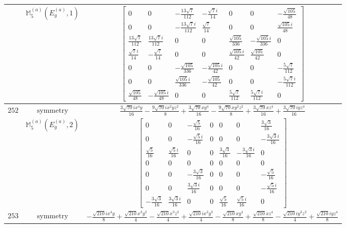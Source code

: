 \documentclass[fleqn,8pt,landscape]{jsarticle}
\begin{document}
\begin{longtable}{ccc}
$  $ & $ \mathbb{M}_{5}^{(a)}(E_{g}^{(a)},1) $ & $ \begin{bmatrix} 0 & 0 & - \frac{13 \sqrt{7}}{112} & - \frac{\sqrt{7} i}{14} & 0 & 0 & - \frac{\sqrt{105}}{48} \\ 0 & 0 & - \frac{13 \sqrt{7} i}{112} & \frac{\sqrt{7}}{14} & 0 & 0 & \frac{\sqrt{105} i}{48} \\ \frac{13 \sqrt{7}}{112} & \frac{13 \sqrt{7} i}{112} & 0 & 0 & \frac{\sqrt{105}}{336} & - \frac{\sqrt{105} i}{336} & 0 \\ \frac{\sqrt{7} i}{14} & - \frac{\sqrt{7}}{14} & 0 & 0 & \frac{\sqrt{105} i}{42} & \frac{\sqrt{105}}{42} & 0 \\ 0 & 0 & - \frac{\sqrt{105}}{336} & - \frac{\sqrt{105} i}{42} & 0 & 0 & - \frac{5 \sqrt{7}}{112} \\ 0 & 0 & \frac{\sqrt{105} i}{336} & - \frac{\sqrt{105}}{42} & 0 & 0 & - \frac{5 \sqrt{7} i}{112} \\ \frac{\sqrt{105}}{48} & - \frac{\sqrt{105} i}{48} & 0 & 0 & \frac{5 \sqrt{7}}{112} & \frac{5 \sqrt{7} i}{112} & 0 \end{bmatrix} $ \\ \hline
$ 252 $ & $ \text{symmetry} $ & $ \frac{3 \sqrt{70} i x^{4} y}{16} - \frac{9 \sqrt{70} i x^{2} y z^{2}}{8} + \frac{3 \sqrt{70} x y^{4}}{16} - \frac{9 \sqrt{70} x y^{2} z^{2}}{8} + \frac{3 \sqrt{70} x z^{4}}{16} + \frac{3 \sqrt{70} i y z^{4}}{16} $ \\
$  $ & $ \mathbb{M}_{5}^{(a)}(E_{g}^{(a)},2) $ & $ \begin{bmatrix} 0 & 0 & - \frac{\sqrt{5}}{16} & 0 & 0 & 0 & \frac{3 \sqrt{3}}{16} \\ 0 & 0 & - \frac{\sqrt{5} i}{16} & 0 & 0 & 0 & - \frac{3 \sqrt{3} i}{16} \\ \frac{\sqrt{5}}{16} & \frac{\sqrt{5} i}{16} & 0 & 0 & \frac{3 \sqrt{3}}{16} & - \frac{3 \sqrt{3} i}{16} & 0 \\ 0 & 0 & 0 & 0 & 0 & 0 & 0 \\ 0 & 0 & - \frac{3 \sqrt{3}}{16} & 0 & 0 & 0 & - \frac{\sqrt{5}}{16} \\ 0 & 0 & \frac{3 \sqrt{3} i}{16} & 0 & 0 & 0 & - \frac{\sqrt{5} i}{16} \\ - \frac{3 \sqrt{3}}{16} & \frac{3 \sqrt{3} i}{16} & 0 & 0 & \frac{\sqrt{5}}{16} & \frac{\sqrt{5} i}{16} & 0 \end{bmatrix} $ \\ \hline
$ 253 $ & $ \text{symmetry} $ & $ - \frac{\sqrt{210} i x^{4} y}{8} + \frac{\sqrt{210} x^{3} y^{2}}{4} - \frac{\sqrt{210} x^{3} z^{2}}{4} + \frac{\sqrt{210} i x^{2} y^{3}}{4} - \frac{\sqrt{210} x y^{4}}{8} + \frac{\sqrt{210} x z^{4}}{8} - \frac{\sqrt{210} i y^{3} z^{2}}{4} + \frac{\sqrt{210} i y z^{4}}{8} $ \\

\end{longtable}
\end{document}
